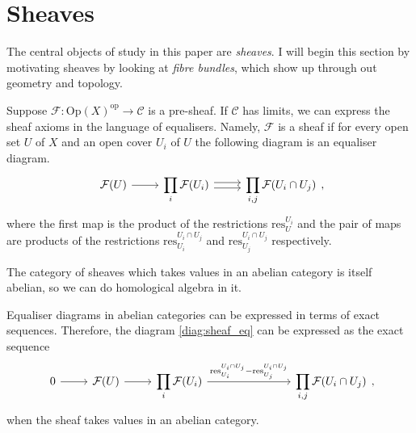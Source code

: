 \section{Sheaves}
The central objects of study in this paper are \emph{sheaves}. I will begin
this section by motivating sheaves by looking at \emph{fibre bundles},
which show up through out geometry and topology.

\begin{cat}
  Suppose $\mathcal{F}: \text{Op}(X)^{\text{op}}\to\mathcal{C}$ is a pre-sheaf.
  If $\mathcal{C}$ has limits, we can express the sheaf axioms in the
  language of equalisers. Namely, $\mathcal{F}$ is a sheaf if for every
  open set $U$ of $X$ and an open cover $U_{i}$ of $U$ the following
  diagram is an equaliser diagram.
  \begin{equation}\label{diag:sheaf_eq}\begin{tikzcd}
      \mathcal{F}(U)\rar
      & \displaystyle\prod_{i}\mathcal{F}(U_{i})\rar[shift left]\rar[shift right]
      & \displaystyle\prod_{i,j}\mathcal{F}(U_{i}\cap U_{j})
    \end{tikzcd},\end{equation}
  where the first map is the product of the restrictions
  $\text{res}_{U}^{U_{i}}$ and the pair of maps are products of the
  restrictions $\text{res}_{U_{i}}^{U_{i}\cap U_{j}}$ and
  $\text{res}_{U_{j}}^{U_{i}\cap U_{j}}$ respectively.
\end{cat}

The category of sheaves which takes values in an abelian category is
itself abelian, so we can do homological algebra in it.
\begin{cat}
  Equaliser diagrams in abelian categories can be expressed in terms
  of exact sequences. Therefore, the diagram \eqref{diag:sheaf_eq}
  can be expressed as the exact sequence
  \begin{equation}\label{diag:sheaf_ex}\begin{tikzcd}
      0\rar & \mathcal{F}(U)\rar & \displaystyle\prod_{i}\mathcal{F}(U_{i})
      \rar{\text{res}_{U_{i}}^{U_{i}\cap U_{j}}-\text{res}_{U_{j}}^{U_{i}\cap U_{j}}}
      &[5em] \displaystyle\prod_{i,j}\mathcal{F}(U_{i}\cap U_{j})
    \end{tikzcd},\end{equation}
  when the sheaf takes values in an abelian category.
\end{cat}

